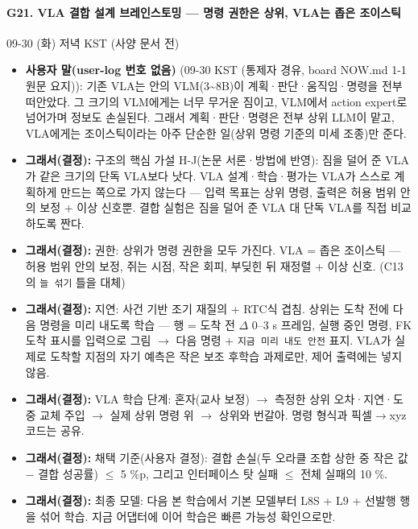 \paragraph{G21. VLA 결합 설계 브레인스토밍 --- 명령 권한은 상위, VLA는 좁은 조이스틱}
{\small 09-30 (화) 저녁 KST (사양 문서 전)}
\begin{itemize}
  \item \textbf{사용자 말(user-log 번호 없음)} (09-30 KST (통제자 경유, board NOW.md 1-1 원문 요지)): 기존 VLA는 안의 VLM(3\textasciitilde{}8B)이 계획·판단·움직임·명령을 전부 떠안았다. 그 크기의 VLM에게는 너무 무거운 짐이고, VLM에서 action expert로 넘어가며 정보도 손실된다. 그래서 계획·판단·명령은 전부 상위 LLM이 맡고, VLA에게는 조이스틱이라는 아주 단순한 일(상위 명령 기준의 미세 조종)만 준다.
  \item \textbf{그래서(결정):} 구조의 핵심 가설 H-J(논문 서론·방법에 반영): 짐을 덜어 준 VLA가 같은 크기의 단독 VLA보다 낫다. VLA 설계·학습·평가는 VLA가 스스로 계획하게 만드는 쪽으로 가지 않는다 --- 입력 목표는 상위 명령, 출력은 허용 범위 안의 보정 + 이상 신호뿐. 결합 실험은 짐을 덜어 준 VLA 대 단독 VLA를 직접 비교하도록 짠다.
  \item \textbf{그래서(결정):} 권한: 상위가 명령 권한을 모두 가진다. VLA = 좁은 조이스틱 --- 허용 범위 안의 보정, 쥐는 시점, 작은 회피, 부딪힌 뒤 재정렬 + 이상 신호. (C13의 \texttt{늘 섞기} 틀을 대체)
  \item \textbf{그래서(결정):} 지연: 사건 기반 조기 재질의 + RTC식 겹침. 상위는 도착 전에 다음 명령을 미리 내도록 학습 --- 행 = 도착 전 $\Delta$ 0--3 s 프레임, 실행 중인 명령, FK 도착 표시를 입력으로 그림 $\rightarrow$ 다음 명령 + \texttt{지금 미리 내도 안전} 표지. VLA가 실제로 도착할 지점의 자기 예측은 작은 보조 후학습 과제로만, 제어 출력에는 넣지 않음.
  \item \textbf{그래서(결정):} VLA 학습 단계: 혼자(교사 보정) $\rightarrow$ 측정한 상위 오차·지연·도중 교체 주입 $\rightarrow$ 실제 상위 명령 위 $\rightarrow$ 상위와 번갈아. 명령 형식과 픽셀$\rightarrow$xyz 코드는 공유.
  \item \textbf{그래서(결정):} 채택 기준(사용자 결정): 결합 손실(두 오라클 조합 상한 중 작은 값 $-$ 결합 성공률) $\leq$ 5 \%p, 그리고 인터페이스 탓 실패 $\leq$ 전체 실패의 10 \%.
  \item \textbf{그래서(결정):} 최종 모델: 다음 본 학습에서 기본 모델부터 L8S + L9 + 선발행 행을 섞어 학습. 지금 어댑터에 이어 학습은 빠른 가능성 확인으로만.
\end{itemize}

